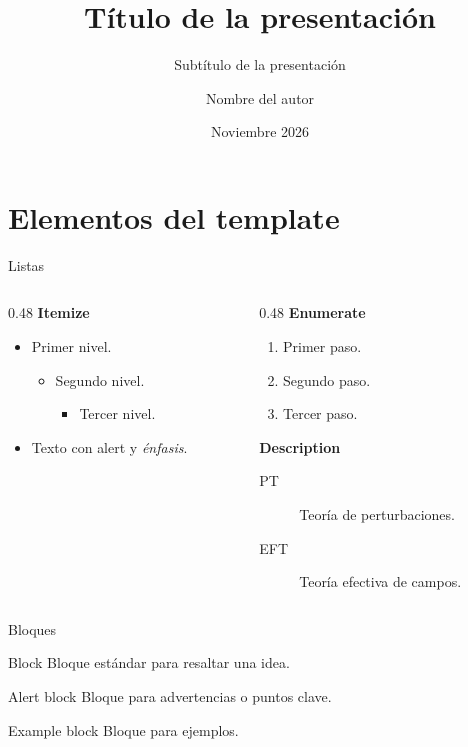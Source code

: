 \documentclass[aspectratio=169]{beamer}
\title[Título corto]{Título de la presentación}
\subtitle[Subtítulo corto]{Subtítulo de la presentación}
\author[Autor]{Nombre del autor}
\institute{Universidad Nacional Autónoma de México}
\date{Noviembre 2026}
\begin{document}
\titleframe

\section{Elementos del template}

\begin{frame}{Listas}
  \begin{columns}[T]
    \begin{column}{0.48\textwidth}
      \textbf{Itemize}
      \begin{itemize}
        \item Primer nivel.
          \begin{itemize}
            \item Segundo nivel.
              \begin{itemize}
                \item Tercer nivel.
              \end{itemize}
          \end{itemize}
        \item Texto con \alert{alert} y \emph{énfasis}.
      \end{itemize}
    \end{column}
    \begin{column}{0.48\textwidth}
      \textbf{Enumerate}
      \begin{enumerate}
        \item Primer paso.
        \item Segundo paso.
        \item Tercer paso.
      \end{enumerate}
      \vspace{0.5em}
      \textbf{Description}
      \begin{description}
        \item[PT] Teoría de perturbaciones.
        \item[EFT] Teoría efectiva de campos.
      \end{description}
    \end{column}
  \end{columns}
\end{frame}

\begin{frame}{Bloques}
  \begin{block}{Block}
    Bloque estándar para resaltar una idea.
  \end{block}
  \vspace{0.5em}
  \begin{alertblock}{Alert block}
    Bloque para advertencias o puntos clave.
  \end{alertblock}
  \vspace{0.5em}
  \begin{exampleblock}{Example block}
    Bloque para ejemplos.
  \end{exampleblock}
\end{frame}
\end{document}
